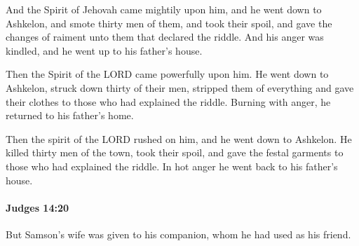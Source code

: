 			\begin{versebox}
					\item[BHS] 
					\item[ASV] And the Spirit of Jehovah came mightily upon him, and he went down to Ashkelon, and smote thirty men of them, and took their spoil, and gave the changes of raiment unto them that declared the riddle. And his anger was kindled, and he went up to his father's house.
					\item[NIV] Then the Spirit of the LORD came powerfully upon him. He went down to Ashkelon, struck down thirty of their men, stripped them of everything and gave their clothes to those who had explained the riddle. Burning with anger, he returned to his father’s home.
					\item[NRSV] Then the spirit of the LORD rushed on him, and he went down to Ashkelon. He killed thirty men of the town, took their spoil, and gave the festal garments to those who had explained the riddle. In hot anger he went back to his father’s house.
			\end{versebox}

		\paragraph{Judges 14:20} %
			\label{JUDGES-14-20}

			But Samson’s wife was given to his companion, whom he had used as his friend.


